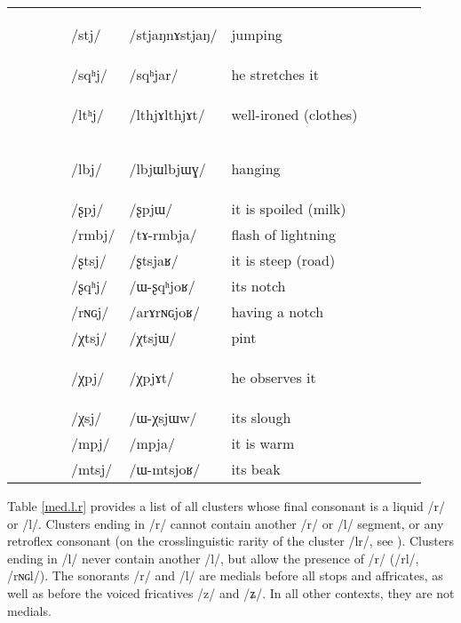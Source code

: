\documentclass[oneside,a4paper,11pt]{article}
\newcommand{\ipa}[1]{\mbox{\phon/#1/}}
\newcommand{\trois}[1]{\ipa{#1}\addtocounter{3clusters}{1}}
\newcommand{\tib}[1]{\cellcolor{lightgray}\textbf{#1}}
\newcommand{\idph}[1]{\cellcolor{gray}\textbf{#1}}
\newcommand{\resetcounters}[2]{
\newcounter{#1}
\newcounter{#2}
 \setcounter{#1}{\value{2clusters}}
  \setcounter{#2}{\value{3clusters}}
 \setcounter{2clusters}{0}
  \setcounter{3clusters}{0}
}
\begin{document}
\begin{table}
{\begin{tabular}{l|lll|lll|lll|l}
 		 		& 		&		&		&\trois{stj}  \idph{}		&\ipa{stjaŋnɤstjaŋ} 		&jumping \\
 		& 		&		&		&\trois{sqʰj} 		&\ipa{sqʰjar} 		& he stretches it\\
\midrule										
 		& 		&		&		&\trois{ltʰj}  \idph{}		&\ipa{lthjɤlthjɤt} 		&well-ironed (clothes)\\
 		& 		&		&		&\trois{lbj} \idph{}		&\ipa{lbjɯlbjɯɣ} 		&hanging\\
\midrule												
 		& 		&		&		&\trois{ʂpj} 		&\ipa{ʂpjɯ} 		&it is spoiled (milk)\\
 		& 		&		&		&\trois{rmbj} 		&\ipa{tɤ-rmbja} 		&flash of lightning\\
 		& 		&		&		&\trois{ʂtsj} 		&\ipa{ʂtsjaʁ} 		&it is steep (road)\\
 		& 		&		&		&\trois{ʂqʰj} 		&\ipa{ɯ-ʂqʰjoʁ} 		&its notch\\
 		& 		&		&		&\trois{rɴɢj} 		&\ipa{arɤrɴɢjoʁ} 		&having a notch\\
\midrule												
 		& 		&		&		&\trois{χtsj} 		&\ipa{χtsjɯ} 		&pint\\
 		& 		&		&		&\trois{χpj} \tib{}		&\ipa{χpjɤt} 		&he  observes it\\
 		& 		&		&		&\trois{χsj} 		&\ipa{ɯ-χsjɯw} 		&its slough \\
\midrule												
 		& 		&		&		&\trois{mpj} 		&\ipa{mpja} 		&it is warm\\
 		& 		&		&		&\trois{mtsj} 		&\ipa{ɯ-mtsjoʁ} 		&its beak\\
\bottomrule
\end{tabular}}
\end{table}
  \resetcounters{2Cjw}{3Cjw} %
  
 Table \ref{med.l.r} provides a  list of all clusters whose final consonant is a liquid  \ipa{r} or \ipa{l}. Clusters ending in \ipa{r} cannot contain another \ipa{r} or \ipa{l} segment, or any retroflex consonant (on the crosslinguistic rarity of the cluster \ipa{lr}, see \citealt[78]{baroni14invariant}). Clusters ending in \ipa{l} never contain another \ipa{l}, but allow the presence of \ipa{r} (\ipa{rl}, \ipa{rɴɢl}). The sonorants \ipa{r} and \ipa{l} are medials before all stops and affricates, as well as before the voiced fricatives \ipa{z} and \ipa{ʑ}. In all other contexts, they are not medials.
  
\end{document}
